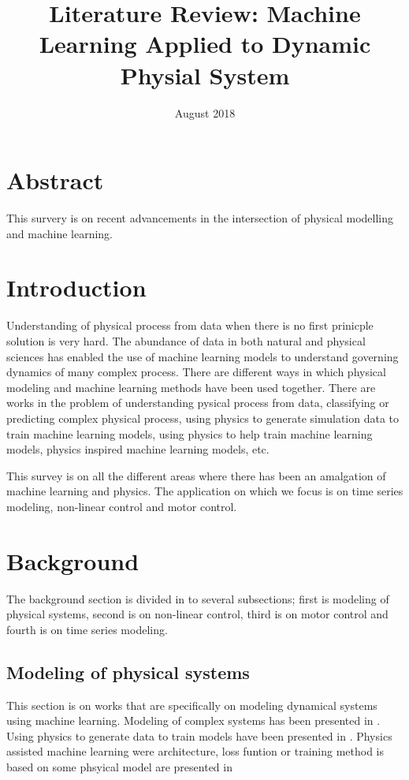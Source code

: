 \documentclass[conference]{IEEEtran}
\begin{document}
\title{Literature Review: Machine Learning Applied to Dynamic Physial System}
\date{August 2018}

\maketitle

\section{Abstract}
This survery is on recent advancements in the intersection of physical modelling and machine learning.

\section{Introduction}
Understanding of physical process from data when there is no first prinicple solution is very hard. The abundance of data in both natural and physical sciences has enabled the use of machine learning models to understand governing dynamics of many complex process. There are different ways in which physical modeling and machine learning methods have been used together. There are works in the problem of understanding pysical process from data, classifying or predicting complex physical process, using physics to generate simulation data to train machine learning models, using physics to help train machine learning models, physics inspired machine learning models, etc.

This survey is on all the different areas where there has been an amalgation of machine learning and physics. The application on which we focus is on time series modeling, non-linear control and motor control.

\section{Background}
The background section is divided in to several subsections; first is modeling of physical systems, second is on non-linear control, third is on motor control and fourth is on time series modeling.

\subsection{Modeling of physical systems}

This section is on works that are specifically on modeling dynamical systems using machine learning. Modeling of complex systems has been presented in \cite{hermans2014automated, kutz2017datadriven, rudy2017datadriven, Brunton3932, benzenac2017dlphy, d'agnolo2018learning}. Using physics to generate data to train models have been presented in \cite{Peurifoyeaar4206, burda2018large-scale, peng2018deepmimic}. Physics assisted machine learning were architecture, loss funtion or training method is based on some phsyical model are presented in \cite{karpatne2017nips}
\end{document}

